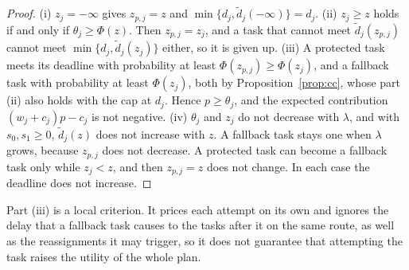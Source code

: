 \begin{proof}
(i) $z_j=-\infty$ gives $z_{p,j}=z$ and $\min\{d_j,\tilde d_j(-\infty)\}=d_j$. (ii) $z_j\ge z$ holds if and only if
$\theta_j\ge\Phi(z)$. Then $z_{p,j}=z_j$, and a task that cannot meet $\tilde d_j(z_{p,j})$ cannot meet
$\min\{d_j,\tilde d_j(z_j)\}$ either, so it is given up. (iii) A protected task meets its deadline with probability at
least $\Phi(z_{p,j})\ge\Phi(z_j)$, and a fallback task with probability at least $\Phi(z_j)$, both by
Proposition~\ref{prop:cc}, whose part (ii) also holds with the cap at $d_j$. Hence $p\ge\theta_j$, and the expected
contribution $(w_j+c_j)p-c_j$ is not negative. (iv) $\theta_j$ and $z_j$ do not decrease with $\lambda$, and with
$s_0,s_1\ge0$, $\tilde d_j(z)$ does not increase with $z$. A fallback task stays one when $\lambda$ grows, because
$z_{p,j}$ does not decrease. A protected task can become a fallback task only while $z_j<z$, and then $z_{p,j}=z$ does not
change. In each case the deadline does not increase.
\end{proof}

Part (iii) is a local criterion. It prices each attempt on its own and ignores the delay that a fallback task causes to
the tasks after it on the same route, as well as the reassignments it may trigger, so it does not guarantee that
attempting the task raises the utility of the whole plan.
